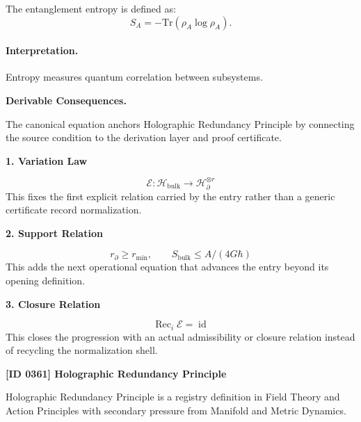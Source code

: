 The entanglement entropy is defined as:
\begin{equation}
S_A = -\mathrm{Tr}(\rho_A \log \rho_A).
\end{equation}

\paragraph{Interpretation.}
Entropy measures quantum correlation between subsystems.

\par\vspace{0.35em}
\noindent\textbf{Derivable Consequences.}\quad
\begingroup
\footnotesize
\raggedright
The canonical equation anchors Holographic Redundancy Principle by connecting the source condition to the derivation layer and proof certificate.
\par\endgroup

\noindent\textbf{1. Variation Law}\par
\[
\mathcal{E}:\mathcal{H}_{\mathrm{bulk}}\to\mathcal{H}_{\partial}^{\otimes r}
\]
\noindent This fixes the first explicit relation carried by the entry rather than a generic certificate record normalization.\par
\noindent\textbf{2. Support Relation}\par
\[
r_{\partial}\geq r_{\min},\qquad S_{\mathrm{bulk}}\leq A/(4G\hbar)
\]
\noindent This adds the next operational equation that advances the entry beyond its opening definition.\par
\noindent\textbf{3. Closure Relation}\par
\[
\operatorname{Rec}_{i}\mathcal{E}=\operatorname{id}
\]
\noindent This closes the progression with an actual admissibility or closure relation instead of recycling the normalization shell.\par

\clearpage
\noindent\textbf{[ID 0361] Holographic Redundancy Principle}\par
\vspace{0.35em}
\begingroup\small
{}
Holographic Redundancy Principle is a registry definition in Field Theory and Action Principles with secondary pressure from Manifold and Metric Dynamics.

